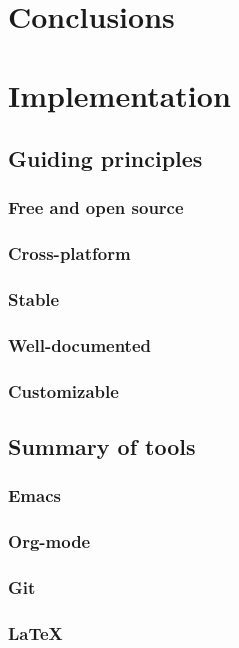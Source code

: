 \documentclass{book}
\begin{document}
\chapter{Conclusions}
\label{sec-9}
\label{conclusions}
\chapter{Implementation}
\label{sec-10}
\section{Guiding principles}
\label{sec-10-1}
\subsection{Free and open source}
\label{sec-10-1-1}
\subsection{Cross-platform}
\label{sec-10-1-2}
\subsection{Stable}
\label{sec-10-1-3}
\subsection{Well-documented}
\label{sec-10-1-4}
\subsection{Customizable}
\label{sec-10-1-5}
\section{Summary of tools}
\label{sec-10-2}
\subsection{Emacs}
\label{sec-10-2-1}
\subsection{Org-mode}
\label{sec-10-2-2}
\subsection{Git}
\label{sec-10-2-3}
\subsection{\LaTeX{}}
\label{sec-10-2-4}
\end{document}
